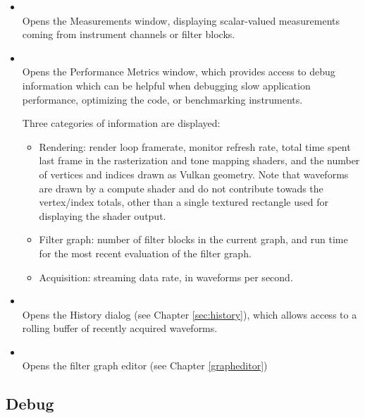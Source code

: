 \begin{itemize}
\item {}\\
Opens the Measurements window, displaying scalar-valued measurements coming from instrument channels or filter blocks.

\item {}\\

Opens the Performance Metrics window, which provides access to debug information which can be helpful when debugging
slow application performance, optimizing the code, or benchmarking instruments.

Three categories of information are displayed:

\begin{itemize}
\item Rendering: render loop framerate, monitor refresh rate, total time spent last frame in the rasterization and tone
mapping shaders, and the number of vertices and indices drawn as Vulkan geometry. Note that waveforms are drawn by a
compute shader and do not contribute towads the vertex/index totals, other than a single textured rectangle used for
displaying the shader output.
\item Filter graph: number of filter blocks in the current graph, and run time for the most recent evaluation of the
filter graph.
\item Acquisition: streaming data rate, in waveforms per second.
\end{itemize}

\item {}\\

Opens the History dialog (see Chapter \ref{sec:history}), which allows access to a rolling buffer of recently acquired
waveforms.

\item {}\\
Opens the filter graph editor (see Chapter \ref{grapheditor})

\end{itemize}


\subsection{Debug}

